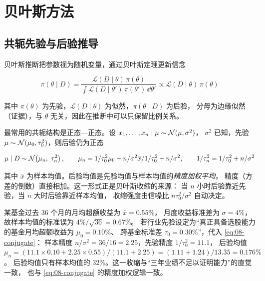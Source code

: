 \section{贝叶斯方法}

\subsection{共轭先验与后验推导}

贝叶斯推断把参数视为随机变量，通过贝叶斯定理更新信念

\begin{equation}
  \pi(\theta \mid D) = \frac{\mathcal{L}(D \mid \theta)\,\pi(\theta)}{\int \mathcal{L}(D \mid \theta')\,\pi(\theta')\,\dd\theta'}
  \propto \mathcal{L}(D \mid \theta)\,\pi(\theta)
  \label{eq:08-bayes}
\end{equation}

其中 $\pi(\theta)$ 为先验，$\mathcal{L}(D\mid\theta)$ 为似然，$\pi(\theta\mid D)$ 为后验，
分母为边缘似然（证据），与 $\theta$ 无关，因此在推断中可以只保留比例关系。

最常用的共轭结构是正态—正态。设 $x_1,\dots,x_n \mid \mu \sim \mathcal{N}(\mu,\sigma^{2})$，
$\sigma^{2}$ 已知，先验 $\mu \sim \mathcal{N}(\mu_0,\tau_0^{2})$，则后验仍为正态

\begin{equation}
  \mu \mid D \sim \N\!\left(\mu_n,\ \tau_n^{2}\right), \qquad
  \mu_n = \frac{\frac{1}{\tau_0^{2}}\mu_0 + \frac{n}{\sigma^{2}}\bar{x}}
  {\frac{1}{\tau_0^{2}} + \frac{n}{\sigma^{2}}}, \qquad
  \frac{1}{\tau_n^{2}} = \frac{1}{\tau_0^{2}} + \frac{n}{\sigma^{2}}
  \label{eq:08-conjugate}
\end{equation}

其中 $\bar{x}$ 为样本均值。后验均值是先验均值与样本均值的\emph{精度加权平均}，
精度（方差的倒数）直接相加。这一形式正是贝叶斯收缩的来源：
当 $n$ 小时后验靠近先验，当 $n$ 大时后验靠近样本均值，
收缩强度由信噪比 $n\tau_0^{2}/\sigma^{2}$ 自动决定。

\begin{example}[基金收益均值的贝叶斯收缩]\label{ex:08-shrink}
某基金过去 $36$ 个月的月均超额收益为 $\bar{x} = 0.55\%$，
月度收益标准差为 $\sigma = 4\%$，故样本均值的标准误为 $4\%/\sqrt{36} = 0.67\%$。
若行业先验设定为“真正具备选股能力的基金月均超额收益为 $\mu_0 = 0.10\%$、
跨基金标准差 $\tau_0 = 0.30\%$”，代入 \cref{eq:08-conjugate}：
样本精度 $n/\sigma^{2} = 36/16 = 2.25$，先验精度 $1/\tau_0^{2} = 11.1$，
后验均值 $\mu_n = (11.1 \times 0.10 + 2.25 \times 0.55)/(11.1 + 2.25) = (1.11 + 1.24)/13.35 = 0.176\%$。
后验均值只有样本均值的 $32\%$。这一收缩与“三年业绩不足以证明能力”的直觉一致，
也与 \cref{eq:08-conjugate} 的精度加权逻辑一致。
\end{example}

